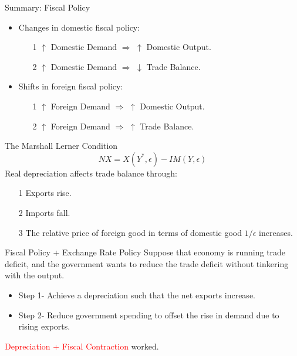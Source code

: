 \documentclass[shownotes,11pt, aspectratio=169]{beamer}
\begin{document}
\begin{frame}{Summary: Fiscal Policy}
\vspace{4mm}

\begin{itemize}
\item Changes in domestic fiscal policy: 
     \begin{itemize} 
     \item[1] $\uparrow$ Domestic Demand $\Rightarrow$ $\uparrow$ Domestic Output.
     \item[2] $\uparrow$ Domestic Demand $\Rightarrow$ $\downarrow$ Trade Balance.
     \end{itemize}
\pause
\vspace{4mm}

\item Shifts in foreign fiscal policy: 
      \begin{itemize}
      \item[1] $\uparrow$ Foreign Demand $\Rightarrow$ $\uparrow$ Domestic Output.
      \item[2] $\uparrow$ Foreign Demand $\Rightarrow$ $\uparrow$ Trade Balance.
      \end{itemize}
\end{itemize}
\end{frame}

\begin{frame}{The Marshall Lerner Condition}
\[ NX = X(Y^{\ast}, \epsilon) - IM(Y, \epsilon) \]
Real depreciation affects trade balance through:
    \begin{itemize}
    \item[1] Exports rise.
    \item[2] Imports fall.
    \item[3] The relative price of foreign good in terms of domestic good $1/\epsilon$ increases.
    \end{itemize}
\end{frame}

\begin{frame}{Fiscal Policy + Exchange Rate Policy}
Suppose that economy is running trade deficit, and the government wants to reduce the trade deficit without tinkering with the output.
\begin{itemize}
\item Step 1- Achieve a depreciation such that the net exports increase.
\item Step 2- Reduce government spending to offset the rise in demand due to rising exports.
\end{itemize}
\textcolor{red}{Depreciation + Fiscal Contraction} worked. 
\end{frame}
\end{document}
